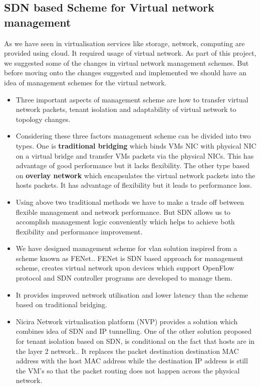 \subsection{SDN based Scheme for Virtual network management}
As we have seen in virtualisation services like storage, network, computing are provided using cloud. It required usage of virtual network. As part of this project, we suggested some of the changes in virtual network management schemes. But before moving onto the changes suggested and implemented we should have an idea of management schemes for the virtual network.
\begin{itemize}
    \item Three important aspects of management scheme are how to transfer virtual network packets, tenant isolation and adaptability of virtual network to topology changes.
    \item Considering these three factors management scheme can be divided into two types. One is \textbf{traditional bridging} which binds VMs NIC with physical NIC on a virtual bridge and transfer VMs packets via the physical NICs. This has advantage of good performance but it lacks flexibility.
    The other type based on \textbf{overlay network} which encapsulates the virtual network packets into the hosts packets. It has advantage of flexibility but it leads to performance loss.
    \item Using above two traditional methods we have to make a trade off between flexible management and network performance. But SDN allows us to accomplish management logic conveniently which helps to  achieve both flexibility and performance improvement.
    \item We have designed management scheme for vlan solution inspired from a scheme known as FENet.\cite{liu2014fenet}. FENet is SDN based approach for management scheme, creates virtual network upon devices which support OpenFlow protocol and SDN controller programs are developed to manage them.
    \item It provides improved network utilisation and lower latency than the scheme based on traditional bridging.
    \item Nicira Network virtualisation platform (NVP) provides a solution which combines idea of SDN and IP tunnelling. One of the other solution proposed for tenant isolation based on SDN, is conditional on the fact that hosts are in the layer 2 network.\cite{nunes2013virtualized}. It replaces the packet destination destination MAC address with the host MAC address while the destination IP address is still the VM's so that the packet routing does not happen across the physical network.
\end{itemize}

